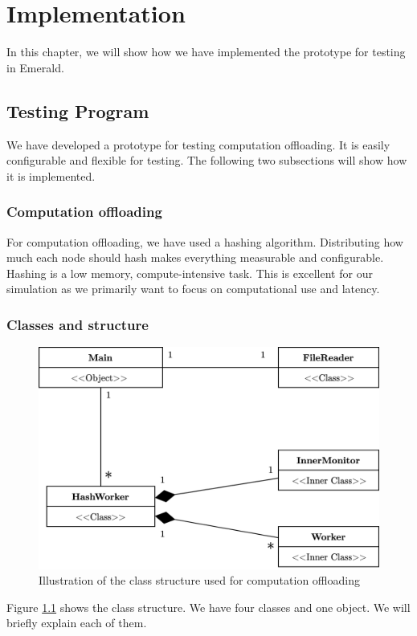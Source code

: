 \chapter{Implementation}\label{chapter:implementation}


In this chapter, we will show how we have implemented the prototype for testing in Emerald.

\section{Testing Program}
We have developed a prototype for testing computation offloading. It is easily configurable and flexible for testing. The following two subsections will show how it is implemented.




\subsection{Computation offloading}
For computation offloading, we have used a hashing algorithm. Distributing how much each node should hash makes everything measurable and configurable. Hashing is a low memory, compute-intensive task. This is excellent for our simulation as we primarily want to focus on computational use and latency.





\subsection{Classes and structure}
\begin{figure}[t]
    \centering
    \includegraphics[scale=0.9]{chapters/5_implementation/figures/HashWorker_class_diagram.png}
    \caption{Illustration of the class structure used for computation offloading}
    \label{fig:HashWorker_class_diagram}
\end{figure}
Figure \ref{fig:HashWorker_class_diagram} shows the class structure. We have four classes and one object. We will briefly explain each of them.


